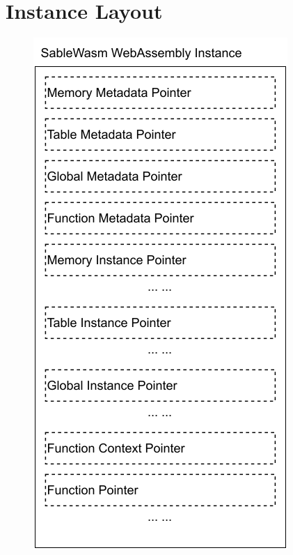 \section{Instance Layout}

\begin{figure}
    \begin{minipage}{.35\textwidth}
        \centering
        \includegraphics[width=\textwidth]{Images/5.Backend_and_Runtime/instance}

\end{minipage}
\end{figure}
